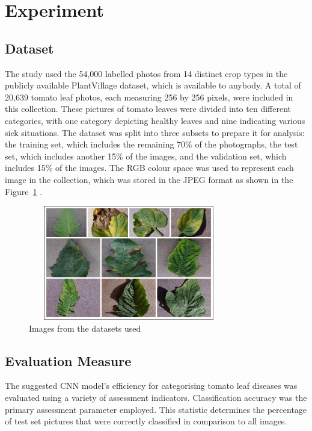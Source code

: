 \documentclass[conference]{IEEEtran}
\begin{document}
\section{Experiment}
\subsection{Dataset}
The study used the 54,000 labelled photos from 14 distinct crop types in the publicly available PlantVillage dataset, which is available to anybody. A total of 20,639 tomato leaf photos, each measuring 256 by 256 pixels, were included in this collection. These pictures of tomato leaves were divided into ten different categories, with one category depicting healthy leaves and nine indicating various sick situations. The dataset was split into three subsets to prepare it for analysis: the training set, which includes the remaining 70\% of the photographs, the test set, which includes another 15\% of the images, and the validation set, which includes 15\% of the images. The RGB colour space was used to represent each image in the collection, which was stored in the JPEG format as shown in the Figure~\ref{fig: Figure 2} .

 \begin{figure}[H]
 \includegraphics[width=8.8cm, height=5cm]{Tomato Dataset.jpg}
\caption{Images from the datasets used}
\label{fig: Figure 2}
\end{figure}
 
\subsection{Evaluation Measure}
The suggested CNN model's efficiency for categorising tomato leaf diseases was evaluated using a variety of assessment indicators. Classification accuracy was the primary assessment parameter employed. This statistic determines the percentage of test set pictures that were correctly classified in comparison to all images.
\\ 
\end{document}
